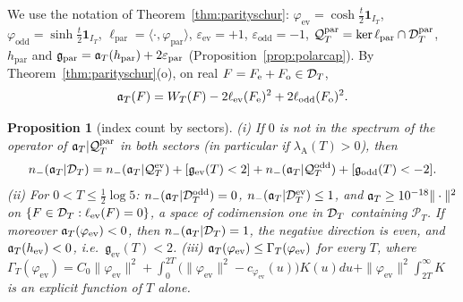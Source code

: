 \documentclass[11pt]{amsart}
\newtheorem{proposition}[theorem]{Proposition}
\theoremstyle{definition}
\theoremstyle{remark}
\newcommand{\PT}{\mathcal P_T}
\newcommand{\IT}{I_T}
\begin{document}
We use the notation of Theorem~\ref{thm:parityschur}: $\varphi_{\mathrm{ev}}=\cosh\frac t2\mathbf 1_{\IT}$,
$\varphi_{\mathrm{odd}}=\sinh\frac t2\mathbf 1_{\IT}$, $\ell_{\mathrm{par}}=\langle\cdot,\varphi_{\mathrm{par}}\rangle$,
$\varepsilon_{\mathrm{ev}}=+1$, $\varepsilon_{\mathrm{odd}}=-1$, $\mathcal Q^{\mathrm{par}}_T=\ker\ell_{\mathrm{par}}\cap\mathcal D_T^{\mathrm{par}}$,
$h_{\mathrm{par}}$ and $\mathfrak g_{\mathrm{par}}=\mathfrak a_T(h_{\mathrm{par}})+2\varepsilon_{\mathrm{par}}$ (Proposition~\ref{prop:polarcap}).
By Theorem~\ref{thm:parityschur}(o), on real $F=F_{\mathrm e}+F_{\mathrm o}\in\mathcal D_T$,
\begin{equation}\label{eq:wh-aW}
\mathfrak a_T(F)=W_T(F)-2\ell_{\mathrm{ev}}(F_{\mathrm e})^2+2\ell_{\mathrm{odd}}(F_{\mathrm o})^2 .
\end{equation}

\begin{proposition}[index count by sectors]\label{prop:wh-index}
\emph{(i)} If $0$ is not in the spectrum of the operator of $\mathfrak a_T|\mathcal Q^{\mathrm{par}}_T$ in both sectors (in particular if $\lambda_{\mathrm A}(T)>0$), then
\[
n_-(\mathfrak a_T|\mathcal D_T)=n_-(\mathfrak a_T|\mathcal Q^{\mathrm{ev}}_T)+[\mathfrak g_{\mathrm{ev}}(T)<2]+n_-(\mathfrak a_T|\mathcal Q^{\mathrm{odd}}_T)+[\mathfrak g_{\mathrm{odd}}(T)<-2].
\]
\emph{(ii)} For $0<T\le\frac12\log5$: $n_-(\mathfrak a_T|\mathcal D_T^{\mathrm{odd}})=0$, $n_-(\mathfrak a_T|\mathcal D_T^{\mathrm{ev}})\le1$, and $\mathfrak a_T\ge10^{-18}\|\cdot\|^2$ on
$\{F\in\mathcal D_T:\ell_{\mathrm{ev}}(F)=0\}$, a space of codimension one in $\mathcal D_T$ containing $\PT$. If moreover $\mathfrak a_T(\varphi_{\mathrm{ev}})<0$, then
$n_-(\mathfrak a_T|\mathcal D_T)=1$, the negative direction is even, and $\mathfrak a_T(h_{\mathrm{ev}})<0$, i.e.\ $\mathfrak g_{\mathrm{ev}}(T)<2$.
\emph{(iii)} $\mathfrak a_T(\varphi_{\mathrm{ev}})\le\Gamma_T(\varphi_{\mathrm{ev}})$ for every $T$, where
$\Gamma_T(\varphi_{\mathrm{ev}})=C_0\|\varphi_{\mathrm{ev}}\|^2+\int_0^{2T}\big(\|\varphi_{\mathrm{ev}}\|^2-c_{\varphi_{\mathrm{ev}}}(u)\big)K(u)du+\|\varphi_{\mathrm{ev}}\|^2\int_{2T}^\infty K$
is an explicit function of $T$ alone.
\end{proposition}
\end{document}
